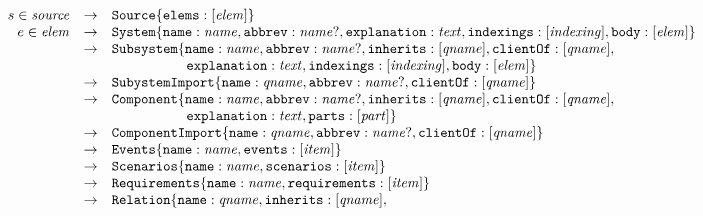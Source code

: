\documentclass{article}
\begin{document}
\[
\begin{array}{rcll}
  s \in \nt{source} & \rightarrow &\lab{Source}\{\lab{elems}:\listof{\nt{elem}}\} \\
  e \in \nt{elem} & \rightarrow & \lab{System}\{\lab{name}:\nt{name},\lab{abbrev}:\optof{\nt{name}},
                                                \lab{explanation}:\nt{text},\lab{indexings}:\listof{\nt{indexing}},
                                                \lab{body}:\listof{\nt{elem}}\} \\
                  & \rightarrow & \lab{Subsystem}\{\lab{name}:\nt{name},\lab{abbrev}:\optof{\nt{name}},
                                                \lab{inherits}:\listof{\nt{qname}},\lab{clientOf}:\listof{\nt{qname}}, \\
                  &             & \ \ \ \ \ \ \ \ \ \ \ \ \ \ \ \
                                                \lab{explanation}:\nt{text},\lab{indexings}:\listof{\nt{indexing}},
                                                \lab{body}:\listof{\nt{elem}}\} \\
                  & \rightarrow & \lab{SubystemImport}\{\lab{name}:\nt{qname},\lab{abbrev}:\optof{\nt{name}},
                                                        \lab{clientOf}:\listof{\nt{qname}}\} \\
                  & \rightarrow &\lab{Component}\{\lab{name}:\nt{name},\lab{abbrev}:\optof{\nt{name}},
                                                \lab{inherits}:\listof{\nt{qname}},\lab{clientOf}:\listof{\nt{qname}},\\
                  &             & \ \ \ \ \ \ \ \ \ \ \ \ \ \ \ \
                                                \lab{explanation}:\nt{text},\lab{parts}:\listof{\nt{part}}\} \\
                  & \rightarrow & \lab{ComponentImport}\{\lab{name}:\nt{qname},\lab{abbrev}:\optof{\nt{name}},
                                                         \lab{clientOf}:\listof{\nt{qname}}\} \\
                  & \rightarrow & \lab{Events}\{\lab{name}:\nt{name},\lab{events}:\listof{\nt{item}}\} \\
                  & \rightarrow & \lab{Scenarios}\{\lab{name}:\nt{name},\lab{scenarios}:\listof{\nt{item}}\} \\
                  & \rightarrow & \lab{Requirements}\{\lab{name}:\nt{name},\lab{requirements}:\listof{\nt{item}}\} \\
                  & \rightarrow & \lab{Relation}\{\lab{name}:\nt{qname},\lab{inherits}:\listof{\nt{qname}},

\end{array}\]
\end{document}
